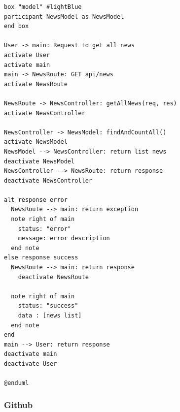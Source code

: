 \begin{enumerate}[a)]
\begin{lstlisting}
box "model" #lightBlue
participant NewsModel as NewsModel
end box

User -> main: Request to get all news
activate User
activate main
main -> NewsRoute: GET api/news
activate NewsRoute

NewsRoute -> NewsController: getAllNews(req, res)
activate NewsController

NewsController -> NewsModel: findAndCountAll()
activate NewsModel
NewsModel --> NewsController: return list news
deactivate NewsModel
NewsController --> NewsRoute: return response
deactivate NewsController

alt response error
  NewsRoute --> main: return exception
  note right of main
    status: "error"
    message: error description
  end note
else response success
  NewsRoute --> main: return response
    deactivate NewsRoute

  note right of main
    status: "success"
    data : [news list]
  end note
end
main --> User: return response
deactivate main
deactivate User

@enduml

\end{lstlisting}

\end{enumerate}


\subsubsection*{Github}

